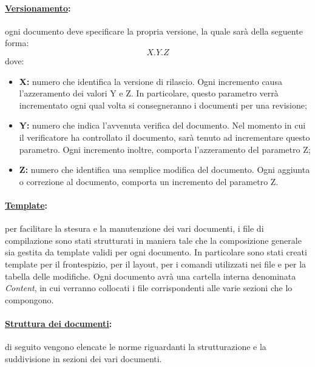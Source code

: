 \paragraph{\underline{Versionamento}:}
ogni documento deve specificare la propria versione, la quale sarà della seguente forma:
\begin{displaymath}
X.Y.Z
\end{displaymath}
dove:
\begin{itemize}
\item\textbf{X:} numero che identifica la versione di rilascio. Ogni incremento causa l'azzeramento dei valori Y e Z. In particolare, questo parametro verrà incrementato ogni qual volta si consegneranno i documenti per una revisione;
\item\textbf{Y:} numero che indica l'avvenuta verifica del documento. Nel momento in cui il verificatore ha controllato il documento, sarà tenuto ad incrementare questo parametro. Ogni incremento inoltre, comporta l'azzeramento del parametro Z;
\item \textbf{Z:} numero che identifica una semplice modifica del documento. Ogni aggiunta o correzione al documento, comporta un incremento del parametro Z.
\end{itemize}

\paragraph{\underline{Template}:}
per facilitare la stesura e la manutenzione dei vari documenti, i file di compilazione sono stati strutturati in maniera tale che la composizione generale sia gestita da template validi per ogni documento. In particolare sono stati creati template per il frontespizio, per il layout, per i comandi utilizzati nei file e per la tabella delle modifiche. Ogni documento avrà una cartella interna denominata \textit{Content}, in cui verranno collocati i file corrispondenti alle varie sezioni che lo compongono.

\paragraph{\underline{Struttura dei documenti}:}
di seguito vengono elencate le norme riguardanti la strutturazione e la suddivisione in sezioni dei vari documenti.

